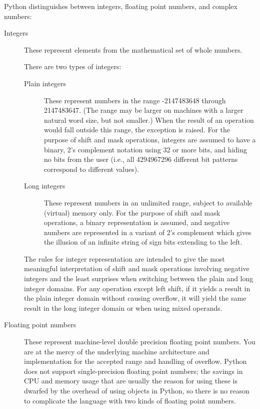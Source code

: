 \begin{description}
Python distinguishes between integers, floating point numbers, and
complex numbers:

\begin{description}
\item[Integers]
These represent elements from the mathematical set of whole numbers.

There are two types of integers:

\begin{description}

\item[Plain integers]
These represent numbers in the range -2147483648 through 2147483647.
(The range may be larger on machines with a larger natural word
size, but not smaller.)
When the result of an operation would fall outside this range, the
exception  is raised.
For the purpose of shift and mask operations, integers are assumed to
have a binary, 2's complement notation using 32 or more bits, and
hiding no bits from the user (i.e., all 4294967296 different bit
patterns correspond to different values).

\item[Long integers]
These represent numbers in an unlimited range, subject to available
(virtual) memory only.  For the purpose of shift and mask operations,
a binary representation is assumed, and negative numbers are
represented in a variant of 2's complement which gives the illusion of
an infinite string of sign bits extending to the left.

\end{description} %

The rules for integer representation are intended to give the most
meaningful interpretation of shift and mask operations involving
negative integers and the least surprises when switching between the
plain and long integer domains.  For any operation except left shift,
if it yields a result in the plain integer domain without causing
overflow, it will yield the same result in the long integer domain or
when using mixed operands.

\item[Floating point numbers]
These represent machine-level double precision floating point numbers.  
You are at the mercy of the underlying machine architecture and
\C{} implementation for the accepted range and handling of overflow.
Python does not support single-precision floating point numbers; the
savings in CPU and memory usage that are usually the reason for using
these is dwarfed by the overhead of using objects in Python, so there
is no reason to complicate the language with two kinds of floating
point numbers.


\end{description}
\end{description}

